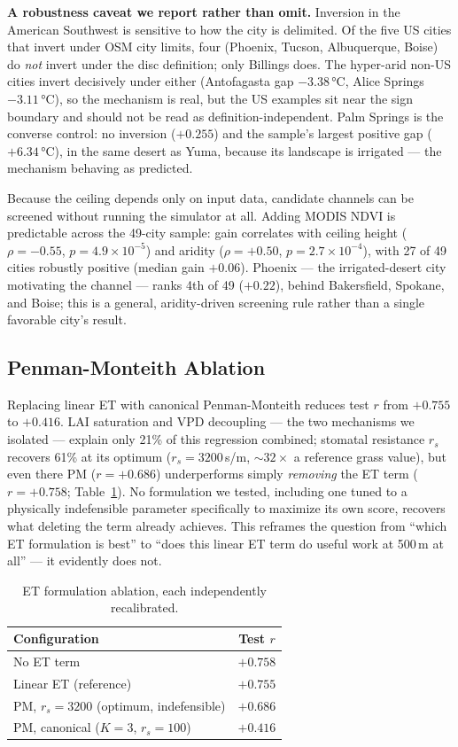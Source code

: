 \documentclass[conference]{IEEEtran}
\begin{document}
\textbf{A robustness caveat we report rather than omit.} Inversion in the
American Southwest is sensitive to how the city is delimited. Of the five
US cities that invert under OSM city limits, four (Phoenix, Tucson,
Albuquerque, Boise) do \emph{not} invert under the disc definition; only
Billings does. The hyper-arid non-US cities invert decisively under either
(Antofagasta gap $-3.38$\,°C, Alice Springs $-3.11$\,°C), so the
mechanism is real, but the US examples sit near the sign boundary and
should not be read as definition-independent. Palm Springs is the
converse control: no inversion ($+0.255$) and the sample's largest
positive gap ($+6.34$\,°C), in the same desert as Yuma, because its
landscape is irrigated --- the mechanism behaving as predicted.

Because the ceiling depends only on input data, candidate channels can be
screened without running the simulator at all. Adding MODIS NDVI is
predictable across the 49-city sample: gain correlates with ceiling
height ($\rho{=}{-}0.55$, $p{=}4.9\times10^{-5}$) and aridity
($\rho{=}{+}0.50$, $p{=}2.7\times10^{-4}$), with 27 of 49 cities robustly
positive (median gain $+0.06$). Phoenix — the irrigated-desert city
motivating the channel — ranks 4th of 49 ($+0.22$), behind Bakersfield,
Spokane, and Boise; this is a general, aridity-driven screening rule
rather than a single favorable city's result.

\subsection{Penman-Monteith Ablation}
Replacing linear ET with canonical Penman-Monteith reduces test $r$ from
$+0.755$ to $+0.416$. LAI saturation and VPD decoupling — the two
mechanisms we isolated — explain only 21\% of this regression combined;
stomatal resistance $r_s$ recovers 61\% at its optimum
($r_s{=}3200$\,s/m, $\sim32\times$ a reference grass value), but even
there PM ($r{=}{+}0.686$) underperforms simply \emph{removing} the ET
term ($r{=}{+}0.758$; Table~\ref{tab:pm}). No formulation we tested,
including one tuned to a physically indefensible parameter specifically
to maximize its own score, recovers what deleting the term already
achieves. This reframes the question from ``which ET formulation is
best'' to ``does this linear ET term do useful work at 500\,m at all'' —
it evidently does not.

\begin{table}[ht]
  \centering
  \caption{ET formulation ablation, each independently recalibrated.}
  \label{tab:pm}
  \scriptsize
  \begin{tabular}{lc}
    \toprule
    Configuration & Test $r$ \\
    \midrule
    No ET term & $\mathbf{+0.758}$ \\
    Linear ET (reference) & $+0.755$ \\
    PM, $r_s{=}3200$ (optimum, indefensible) & $+0.686$ \\
    PM, canonical ($K{=}3$, $r_s{=}100$) & $+0.416$ \\
    \bottomrule
  \end{tabular}
\end{table}
\end{document}

